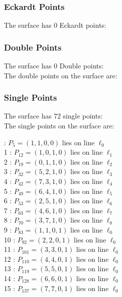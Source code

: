 \documentclass{article}
\begin{document}
{\subsubsection*{Eckardt Points}
The surface has 0 Eckardt points:\\
\subsubsection*{Double Points}
The surface has 0 Double points:\\
The double points on the surface are:\\
\begin{multicols}{2}
\noindent
\end{multicols}
\subsubsection*{Single Points}
The surface has 72 single points:\\
The single points on the surface are:\\
\begin{multicols}{2}
 : $P_{5}=( 1, 1, 0, 0 )$ lies on line $\ell_{0}$\\
1 : $P_{12}=( 1, 0, 1, 0 )$ lies on line $\ell_{1}$\\
2 : $P_{19}=( 0, 1, 1, 0 )$ lies on line $\ell_{2}$\\
3 : $P_{32}=( 5, 2, 1, 0 )$ lies on line $\ell_{3}$\\
4 : $P_{42}=( 7, 3, 1, 0 )$ lies on line $\ell_{4}$\\
5 : $P_{49}=( 6, 4, 1, 0 )$ lies on line $\ell_{5}$\\
6 : $P_{53}=( 2, 5, 1, 0 )$ lies on line $\ell_{6}$\\
7 : $P_{63}=( 4, 6, 1, 0 )$ lies on line $\ell_{7}$\\
8 : $P_{70}=( 3, 7, 1, 0 )$ lies on line $\ell_{8}$\\
9 : $P_{83}=( 1, 1, 0, 1 )$ lies on line $\ell_{0}$\\
10 : $P_{92}=( 2, 2, 0, 1 )$ lies on line $\ell_{0}$\\
11 : $P_{101}=( 3, 3, 0, 1 )$ lies on line $\ell_{0}$\\
12 : $P_{110}=( 4, 4, 0, 1 )$ lies on line $\ell_{0}$\\
13 : $P_{119}=( 5, 5, 0, 1 )$ lies on line $\ell_{0}$\\
14 : $P_{128}=( 6, 6, 0, 1 )$ lies on line $\ell_{0}$\\
15 : $P_{137}=( 7, 7, 0, 1 )$ lies on line $\ell_{0}$\\

\end{multicols}}
\end{document}
